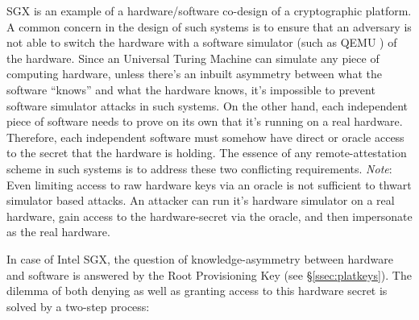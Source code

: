\documentclass[10pt, letterpaper]{article}
\newcommand{\secref}[1]{\S\ref{#1}}
\begin{document}
  SGX is an example of a hardware/software co-design of a
  cryptographic platform. A common concern in the design of such
  systems is to ensure that an adversary is not able to switch the
  hardware with a software simulator (such as QEMU \cite{qemu,
    opensgx}) of the hardware. Since an Universal Turing Machine can
  simulate any piece of computing hardware, unless there's an inbuilt
  asymmetry between what the software ``knows'' and what the hardware
  knows, it's impossible to prevent software simulator attacks in such
  systems. On the other hand, each independent piece of software needs
  to prove on its own that it's running on a real hardware.
  Therefore, each independent software must somehow have direct or
  oracle access to the secret that the hardware is holding. The
  essence of any remote-attestation scheme in such systems is to
  address these two conflicting requirements. {\em Note}: Even limiting
  access to raw hardware keys via an oracle is not sufficient to thwart
  simulator based attacks. An attacker can run it's hardware simulator
  on a real hardware, gain access to the hardware-secret via the
  oracle, and then impersonate as the real hardware.

  In case of Intel SGX, the question of knowledge-asymmetry between
  hardware and software is answered by the Root Provisioning Key (see
  \secref{ssec:platkeys}). The dilemma of both denying as well as
  granting access to this hardware secret is solved by a two-step
  process:
\end{document}
